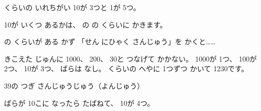 \begin{tsumazuki}{くらいの いれちがい}
10が 3つと 1が 5つ。\hspace{1\zw}\bkbatsu{}\hspace{3\zw}\bkmaru{}\par
10が いくつ あるかは、 の の くらいに かきます。
\end{tsumazuki}

\begin{tsumazuki}{の くらいが ある かず}
「せん にひゃく さんじゅう」を かくと……\par
\bkbatsu{}\hspace{3\zw}\bkmaru{}\par
きこえた じゅんに 1000、 200、 30と つなげて かかない。 1000が 1つ、 100が 2つ、 10が 3つ、 ばらは なし。 くらいの へやに 1つずつ かいて 1230です。
\end{tsumazuki}

\begin{tsumazuki}{39の つぎ}
\bkbatsu\enspace さんじゅうじゅう\hspace{3\zw}\bkmaru{}（よんじゅう）\par
ばらが 10こに なったら たばねて、 10が 4つ。
\end{tsumazuki}



